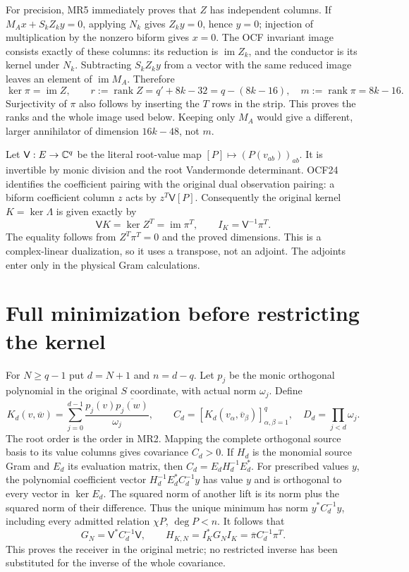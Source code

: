 \documentclass[11pt]{article}
\begin{document}
For precision, MR5 immediately proves that $Z$ has independent columns.
If $M_Ax+S_kZ_ky=0$, applying $N_k$ gives $Z_ky=0$, hence $y=0$;
injection of multiplication by the nonzero biform gives $x=0$.
The OCF invariant image consists exactly of these columns: its reduction
is $\operatorname{im}Z_k$, and the conductor is its kernel under $N_k$.
Subtracting $S_kZ_ky$ from a vector with the same reduced image leaves
an element of $\operatorname{im}M_A$. Therefore
\[
 \ker\pi=\operatorname{im}Z,\qquad
 r:=\operatorname{rank}Z=q'+8k-32=q-(8k-16),
 \quad m:=\operatorname{rank}\pi=8k-16.\tag{MR7}
\]
Surjectivity of $\pi$ also follows by inserting the $T$ rows in the
strip. This proves the ranks and the whole image used below. Keeping
only $M_A$ would give a different, larger annihilator of dimension
$16k-48$, not $m$.

Let $\mathsf V:E\to\mathbb C^q$ be the literal root-value map
$[P]\mapsto(P(v_{ab}))_{ab}$. It is invertible by monic division
and the root Vandermonde determinant. OCF24 identifies the coefficient
pairing with the original dual observation pairing: a biform coefficient
column $z$ acts by $z^T\mathsf V[P]$. Consequently the original kernel
$K=\ker\Lambda$ is given exactly by
\[
 \mathsf V K=\ker Z^T=\operatorname{im}\pi^T,
 \qquad I_K=\mathsf V^{-1}\pi^T.\tag{MR8}
\]
The equality follows from $Z^T\pi^T=0$ and the proved dimensions.
This is a complex-linear dualization, so it uses a transpose, not an
adjoint. The adjoints enter only in the physical Gram calculations.

\section{Full minimization before restricting the kernel}
For $N\ge q-1$ put $d=N+1$ and $n=d-q$. Let $p_j$ be the monic
orthogonal polynomial in the original $S$ coordinate, with actual norm
$\omega_j$. Define
\[
 K_d(v,\overline w)=\sum_{j=0}^{d-1}
       \frac{p_j(v)\overline{p_j(w)}}{\omega_j},
 \qquad C_d=[K_d(v_\alpha,\overline v_\beta)]_{\alpha,\beta=1}^q,
 \quad D_d=\prod_{j<d}\omega_j.\tag{MR9}
\]
The root order is the order in MR2. Mapping the complete orthogonal
source basis to its value columns gives covariance $C_d>0$.
If $H_d$ is the monomial source Gram and $E_d$ its evaluation matrix,
then $C_d=E_dH_d^{-1}E_d^*$. For prescribed values $y$, the polynomial
coefficient vector $H_d^{-1}E_d^*C_d^{-1}y$ has value $y$ and is
orthogonal to every vector in $\ker E_d$. The squared norm of another
lift is its norm plus the squared norm of their difference. Thus the
unique minimum has norm $y^*C_d^{-1}y$, including every admitted
relation $\chi P$, $\deg P<n$. It follows that
\[
 G_N=\mathsf V^*C_d^{-1}\mathsf V,
 \qquad H_{K,N}=I_K^*G_NI_K
           =\overline\pi C_d^{-1}\pi^T.\tag{MR10}
\]
This proves the receiver in the original metric; no restricted inverse
has been substituted for the inverse of the whole covariance.
\end{document}
